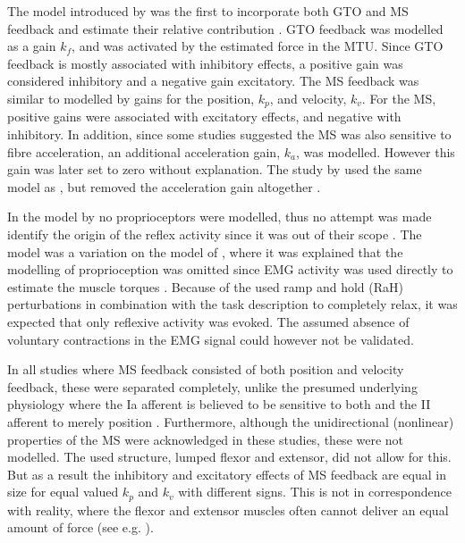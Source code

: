 The model introduced by \citeauthor{schouten_nmclab_2008} was the first to incorporate both GTO and MS feedback and estimate their relative contribution \cite{schouten_nmclab_2008}. GTO feedback was modelled as a gain $k_f$, and was activated by the estimated force in the MTU. Since GTO feedback is mostly associated with inhibitory effects, a positive gain was considered inhibitory and a negative gain excitatory. The MS feedback was similar to \citeauthor{van_der_helm_identification_2002} modelled by gains for the position, $k_p$, and velocity, $k_v$. For the MS, positive gains were associated with excitatory effects, and negative with inhibitory. In addition, since some studies suggested the MS was also sensitive to fibre acceleration, an additional acceleration gain, $k_a$, was modelled. However this gain was later set to zero without explanation. The study by \citeauthor{mugge_rigorous_2010} used the same model as \citeauthor{schouten_nmclab_2008}, but removed the acceleration gain altogether \cite{mugge_rigorous_2010}.

In the model by \citeauthor{de_gooijer-van_de_groep_estimation_2016} no proprioceptors were modelled, thus no attempt was made identify the origin of the reflex activity since it was out of their scope \cite{de_gooijer-van_de_groep_estimation_2016}. The model was a variation on the model of \citeauthor{de_vlugt_relation_2010}, where it was explained that the modelling of proprioception was omitted since EMG activity was used directly to estimate the muscle torques \cite{de_vlugt_relation_2010}. Because of the used ramp and hold (RaH) perturbations in combination with the task description to completely relax, it was expected that only reflexive activity was evoked. The assumed absence of voluntary contractions in the EMG signal could however not be validated. 

In all studies where MS feedback consisted of both position and velocity feedback, these were separated completely, unlike the presumed underlying physiology where the Ia afferent is believed to be sensitive to both and the II afferent to merely position \cite{van_der_helm_identification_2002, schouten_nmclab_2008, mugge_rigorous_2010}. Furthermore, although the unidirectional (nonlinear) properties of the MS were acknowledged in these studies, these were not modelled. The used structure, lumped flexor and extensor, did not allow for this. But as a result the inhibitory and excitatory effects of MS feedback are equal in size for equal valued $k_p$ and $k_v$ with different signs. This is not in correspondence with reality, where the flexor and extensor muscles often cannot deliver an equal amount of force (see e.g. \cite{winters_analysis_1985}). 


